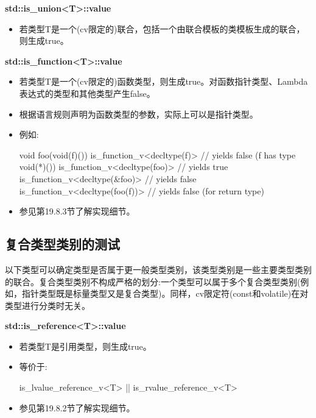 \textbf{std::is\_union<T>::value}

\begin{itemize}
\item 
若类型T是一个(cv限定的)联合，包括一个由联合模板的类模板生成的联合，则生成true。
\end{itemize}

\textbf{std::is\_function<T>::value}

\begin{itemize}
\item 
若类型T是一个(cv限定的)函数类型，则生成true。对函数指针类型、Lambda表达式的类型和其他类型产生false。

\item 
根据语言规则声明为函数类型的参数，实际上可以是指针类型。

\item 
例如:
\begin{cpp}
void foo(void(f)())
{
	is_function_v<decltype(f)> // yields false (f has type void(*)())
	is_function_v<decltype(foo)> // yields true
	is_function_v<decltype(&foo)> // yields false
	is_function_v<decltype(foo(f))> // yields false (for return type)
}
\end{cpp}

\item 
参见第19.8.3节了解实现细节。
\end{itemize}

\subsection{复合类型类别的测试}

以下类型可以确定类型是否属于更一般类型类别，该类型类别是一些主要类型类别的联合。复合类型类别不构成严格的划分:一个类型可以属于多个复合类型类别(例如，指针类型既是标量类型又是复合类型)。同样，cv限定符(const和volatile)在对类型进行分类时无关。

\textbf{std::is\_reference<T>::value}

\begin{itemize}
\item 
若类型T是引用类型，则生成true。

\item 
等价于: 
\begin{cpp}
is_lvalue_reference_v<T> || is_rvalue_reference_v<T>
\end{cpp}

\item 
参见第19.8.2节了解实现细节。
\end{itemize}



